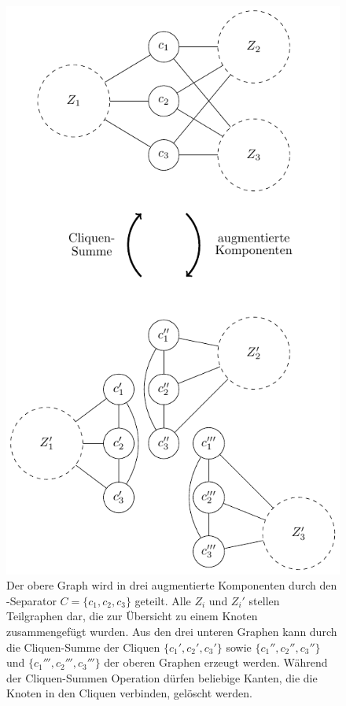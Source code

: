 \begin{figure}[H]
  \centering
  \includegraphics[keepaspectratio]{bilder/Augmentierte_Komponenten.pdf}
  \caption{Der obere Graph wird in drei augmentierte Komponenten durch den \dd-Separator $C = \{c_1, c_2, c_3\}$ geteilt.
           Alle $Z_i$ und $Z_i'$ stellen Teilgraphen dar, die zur Übersicht zu einem Knoten zusammengefügt wurden.
           Aus den drei unteren Graphen kann durch die Cliquen-Summe der Cliquen $\{c_1', c_2', c_3'\}$ sowie $\{c_1'', c_2'', c_3''\}$ und $\{c_1''', c_2''', c_3'''\}$ der oberen Graphen erzeugt werden.
           Während der Cliquen-Summen Operation dürfen beliebige Kanten, die die Knoten in den Cliquen verbinden, gelöscht werden.}
  \label{fig:AugmentierteKomponenten}
\end{figure}
